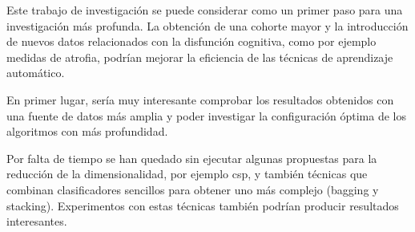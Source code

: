Este trabajo de investigación se puede considerar como un primer paso para una investigación más profunda. La obtención de una cohorte mayor y la introducción de nuevos datos relacionados con la disfunción cognitiva, como por ejemplo medidas de atrofia, podrían mejorar la eficiencia de las técnicas de aprendizaje automático. 

En primer lugar, sería muy interesante comprobar los resultados obtenidos con una fuente de datos más amplia y poder investigar la configuración óptima de los algoritmos con más profundidad. 

Por falta de tiempo se han quedado sin ejecutar algunas propuestas para la reducción de la dimensionalidad, por ejemplo \gls{csp}, y también técnicas que combinan clasificadores sencillos para obtener uno más complejo (bagging y stacking). Experimentos con estas técnicas también podrían producir resultados interesantes.
